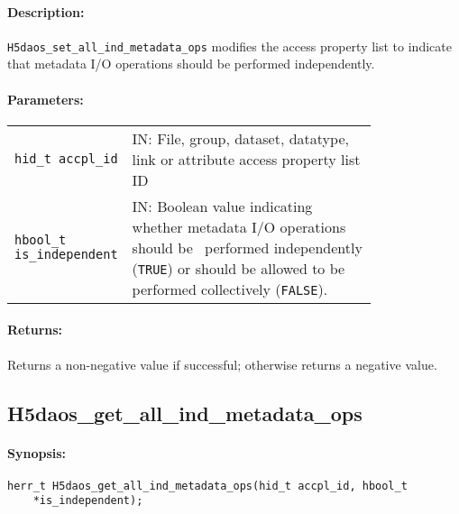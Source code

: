 \documentclass[../users_guide.tex]{subfiles}
\begin{document}
\paragraph{Description:}
\begin{flushleft}%
\texttt{H5daos\_set\_all\_ind\_metadata\_ops} modifies the access property list to indicate
that metadata I/O operations should be performed independently.
\end{flushleft}%

\paragraph{Parameters:}
\begin{flushleft}%
 \begin{tabular}{lp{0.8\linewidth}}%
   \texttt{hid\_t accpl\_id} & IN: File, group, dataset, datatype, link or attribute access property list ID \\
   \texttt{hbool\_t is\_independent} & IN: Boolean value indicating whether metadata I/O operations should be \
   performed independently (\texttt{TRUE}) or should be allowed to be performed collectively (\texttt{FALSE}). \\
 \end{tabular}%
\end{flushleft}%

\paragraph{Returns:}
\begin{flushleft}%
Returns a non-negative value if successful; otherwise returns a negative value.
\end{flushleft}%

\newpage
\subsection{H5daos\_get\_all\_ind\_metadata\_ops}
\label{ref:h5daos_get_all_ind_metadata_ops}

\paragraph{Synopsis:}
\begin{flushleft}%
\begin{verbatim}
herr_t H5daos_get_all_ind_metadata_ops(hid_t accpl_id, hbool_t
    *is_independent);
\end{verbatim}
\end{flushleft}%
\end{document}
